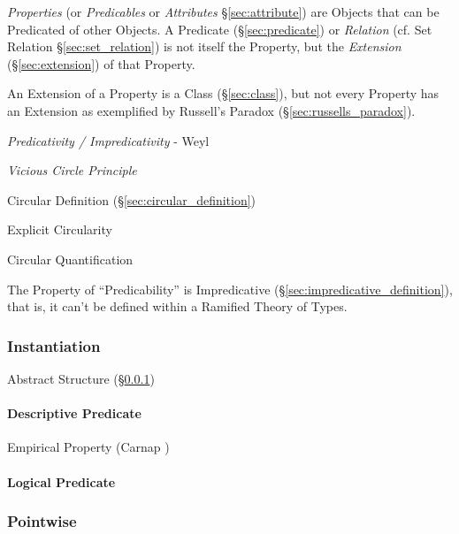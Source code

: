 \emph{Properties} (or \emph{Predicables} or \emph{Attributes}
\S\ref{sec:attribute}) are Objects that can be Predicated of other
Objects. A Predicate (\S\ref{sec:predicate}) or \emph{Relation} (cf.
Set Relation \S\ref{sec:set_relation}) is not itself the Property, but
the \emph{Extension} (\S\ref{sec:extension}) of that Property.

An Extension of a Property is a Class (\S\ref{sec:class}), but not
every Property has an Extension as exemplified by Russell's Paradox
(\S\ref{sec:russells_paradox}).

\emph{Predicativity / Impredicativity} - Weyl

\emph{Vicious Circle Principle}

Circular Definition (\S\ref{sec:circular_definition})

Explicit Circularity

Circular Quantification

The Property of ``Predicability'' is Impredicative
(\S\ref{sec:impredicative_definition}), that is, it can't be defined
within a Ramified Theory of Types.\cite{kleene52}



\subsubsection{Instantiation}\label{sec:instantiation}

Abstract Structure (\S\ref{sec:instantiation})



\paragraph{Descriptive Predicate}\label{sec:descriptive_predicate}\hfill

Empirical Property (Carnap \cite{carnap59})



\paragraph{Logical Predicate}\label{sec:logical_predicate}\hfill



\subsubsection{Pointwise}\label{sec:pointwise}
